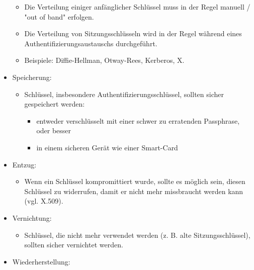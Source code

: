 \documentclass[a4paper]{article}
\begin{document}
\begin{multicols}{3}
\begin{itemize}
              \begin{itemize}
                  \item
                        Die Verteilung einiger anfänglicher Schlüssel muss in der Regel
                        manuell / "out of band" erfolgen.
                  \item
                        Die Verteilung von Sitzungsschlüsseln wird in der Regel während
                        eines Authentifizierungsaustauschs durchgeführt.
                  \item
                        Beispiele: Diffie-Hellman, Otway-Rees, Kerberos, X.
              \end{itemize}
        \item
              Speicherung:

              \begin{itemize}
                  \item
                        Schlüssel, insbesondere Authentifizierungsschlüssel, sollten sicher
                        gespeichert werden:

                        \begin{itemize}
                            \item
                                  entweder verschlüsselt mit einer schwer zu erratenden Passphrase,
                                  oder besser
                            \item
                                  in einem sicheren Gerät wie einer Smart-Card
                        \end{itemize}
              \end{itemize}
        \item
              Entzug:

              \begin{itemize}
                  \item
                        Wenn ein Schlüssel kompromittiert wurde, sollte es möglich sein,
                        diesen Schlüssel zu widerrufen, damit er nicht mehr missbraucht
                        werden kann (vgl. X.509).
              \end{itemize}
        \item
              Vernichtung:

              \begin{itemize}
                  \item
                        Schlüssel, die nicht mehr verwendet werden (z. B. alte
                        Sitzungsschlüssel), sollten sicher vernichtet werden.
              \end{itemize}
        \item
              Wiederherstellung:


\end{itemize}
\end{multicols}
\end{document}
